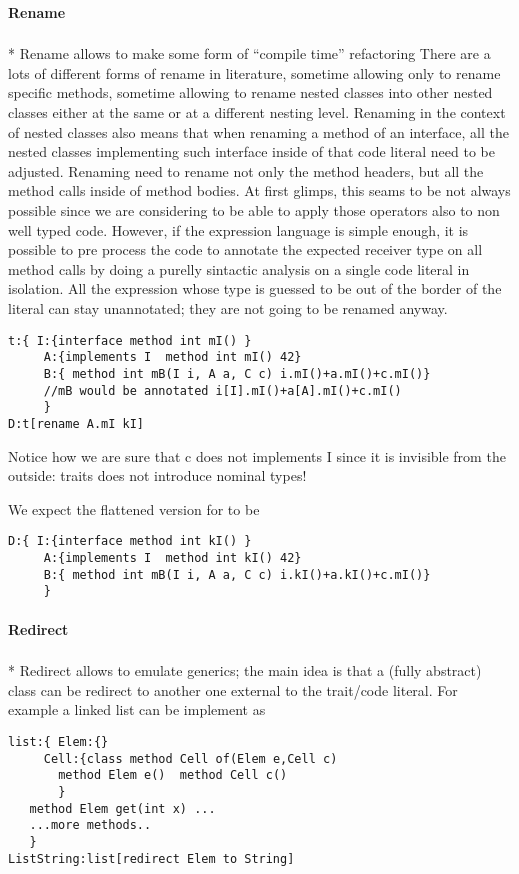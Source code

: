 \paragraph*{Rename}${}_{}$\\*
Rename allows to make some form of ``compile time'' refactoring
There are a lots of different forms of rename in literature,
sometime allowing only to rename specific methods, sometime allowing to rename
nested classes into other nested classes either at the same or at a different nesting level.
Renaming in the context of nested classes also means that when renaming a method of an interface, all the 
nested classes implementing such interface inside of that code literal need to be adjusted.
Renaming need to rename not only the method headers, but all the method calls inside of method bodies.
At first glimps, this seams to be not always possible since we are considering to be able to apply those
operators also to non well typed code.
However, if the expression language is simple enough, it is possible to pre process the code to
annotate the expected receiver type on all method calls by doing a purelly sintactic analysis
on a single code literal in isolation. 
All the expression whose type is guessed to be out of the border of the literal can stay unannotated; they are not going to be renamed anyway.

\begin{lstlisting}
t:{ I:{interface method int mI() }
     A:{implements I  method int mI() 42}
     B:{ method int mB(I i, A a, C c) i.mI()+a.mI()+c.mI()}
     //mB would be annotated i[I].mI()+a[A].mI()+c.mI()
     }
D:t[rename A.mI kI]
\end{lstlisting}
 Notice how we are sure that c does not implements I since it is invisible from the outside: traits does not introduce nominal types!
 
 We expect the flattened version for \Q@D@ to be
\begin{lstlisting}
D:{ I:{interface method int kI() }
     A:{implements I  method int kI() 42}
     B:{ method int mB(I i, A a, C c) i.kI()+a.kI()+c.mI()}
     }
\end{lstlisting}


\paragraph*{Redirect}${}_{}$\\*
Redirect allows to emulate generics; the main idea is that a (fully abstract) class can be redirect to another one external to the trait/code literal.
For example a linked list can be implement as
\begin{lstlisting}
list:{ Elem:{}
     Cell:{class method Cell of(Elem e,Cell c) 
       method Elem e()  method Cell c()
       }
   method Elem get(int x) ...
   ...more methods..
   }
ListString:list[redirect Elem to String]
\end{lstlisting}

